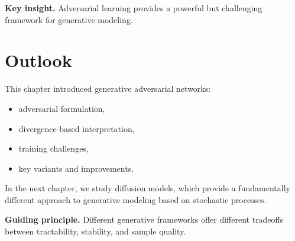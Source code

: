 \noindent
\textbf{Key insight.}  
Adversarial learning provides a powerful but challenging framework for generative modeling.

\section{Outlook}

This chapter introduced generative adversarial networks:
\begin{itemize}
    \item adversarial formulation,
    \item divergence-based interpretation,
    \item training challenges,
    \item key variants and improvements.
\end{itemize}

\medskip

In the next chapter, we study diffusion models, which provide a fundamentally different approach to generative modeling based on stochastic processes.

\medskip

\noindent
\textbf{Guiding principle.}  
Different generative frameworks offer different tradeoffs between tractability, stability, and sample quality.